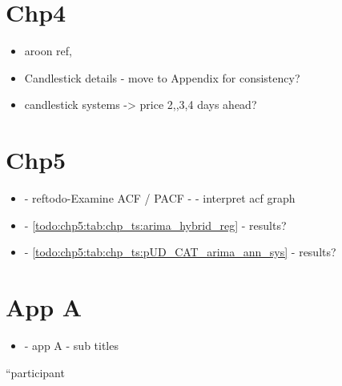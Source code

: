 \section{Chp4}
\begin{itemize}
\item aroon ref, 
\item Candlestick details - move to Appendix for consistency?
\item candlestick systems -> price 2,,3,4 days ahead?
\end{itemize}

\section{Chp5}
\begin{itemize}
\item - ref{todo-Examine ACF / PACF} - - interpret acf graph
\item - \ref{todo:chp5:tab:chp_ts:arima_hybrid_reg} - results?
\item - \ref{todo:chp5:tab:chp_ts:pUD_CAT_arima_ann_sys} - results?
\end{itemize}

\section{App A}
\begin{itemize}
\item - app A - sub titles
\end{itemize}


\textquotedblleft participant